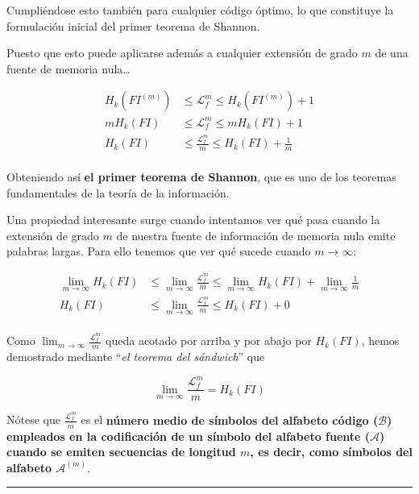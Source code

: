 Cumpliéndose esto también para cualquier código óptimo, lo que
constituye la formulación inicial del primer teorema de Shannon.

Puesto que esto puede aplicarse además a cualquier extensión de grado
\(m\) de una fuente de memoria nula\ldots{}


\begin{align*}
H_k\left(FI^{(m)}\right)&\leq\mathcal{L}_f^m\leq H_k\left(FI^{(m)}\right) + 1\\
mH_k\left(FI\right)&\leq\mathcal{L}_f^m\leq mH_k\left(FI\right) + 1\\
H_k\left(FI\right)&\leq\frac{\mathcal{L}_f^m}{m}\leq H_k\left(FI\right) + \frac{1}{m}\\
\end{align*}


Obteniendo así \textbf{el primer teorema de Shannon}, que es uno de los
teoremas fundamentales de la teoría de la información.

Una propiedad interesante surge cuando intentamos ver qué pasa cuando la
extensión de grado \(m\) de nuestra fuente de información de memoria
nula emite palabras largas. Para ello tenemos que ver qué sucede cuando
\(m\to\infty\):


\begin{align*}
\lim_{m\to\infty}H_k\left(FI\right)&\leq\lim_{m\to\infty}\frac{\mathcal{L}_f^m}{m}\leq \lim_{m\to\infty}H_k\left(FI\right) + \lim_{m\to\infty}\frac{1}{m}\\
H_k\left(FI\right)&\leq\lim_{m\to\infty}\frac{\mathcal{L}_f^m}{m}\leq H_k\left(FI\right) + 0\\
\end{align*}


Como \(\lim_{m\to\infty}\frac{\mathcal{L}_f^m}{m}\) queda acotado por
arriba y por abajo por \(H_k\left(FI\right)\), hemos demostrado mediante
``\emph{el teorema del sándwich}'' que

\[
\lim_{m\to\infty}\frac{\mathcal{L}_f^m}{m} = H_k\left(FI\right)
\]

Nótese que \(\frac{\mathcal{L}_f^m}{m}\) es el \textbf{número medio de
símbolos del alfabeto código (\(\mathcal{B}\)) empleados en la
codificación de un símbolo del alfabeto fuente (\(\mathcal{A}\)) cuando
se emiten secuencias de longitud \(m\), es decir, como símbolos del
alfabeto \(\mathcal{A}^{(m)}\)}.

\begin{center}\rule{0.5\linewidth}{0.5pt}\end{center}


